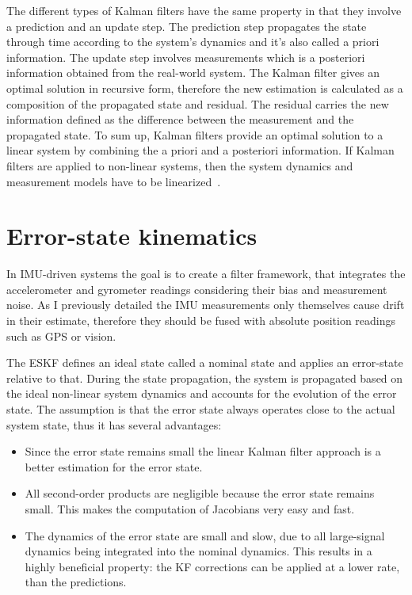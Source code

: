 The different types of Kalman filters have the same property in that they involve a prediction and an update step. The prediction step propagates the state through time according to the system's dynamics and it's also called a priori information. The update step involves measurements which is a posteriori information obtained from the real-world system. The Kalman filter gives an optimal solution in recursive form, therefore the new estimation is calculated as a composition of the propagated state and residual. The residual carries the new information defined as the difference between the measurement and the propagated state. To sum up, Kalman filters provide an optimal solution to a linear system by combining the a priori and a posteriori information. If Kalman filters are applied to non-linear systems, then the system dynamics and measurement models have to be linearized~\cite{discrete_kalman_tutorial}.


\section{Error-state kinematics}

In IMU-driven systems the goal is to create a filter framework, that integrates the accelerometer and gyrometer readings considering their bias and measurement noise. As I previously detailed the IMU measurements only themselves cause drift in their estimate, therefore they should be fused with absolute position readings such as GPS or vision.

The ESKF defines an ideal state called a nominal state and applies an error-state relative to that. During the state propagation, the system is propagated based on the ideal non-linear system dynamics and accounts for the evolution of the error state. The assumption is that the error state always operates close to the actual system state, thus it has several advantages:
\begin{itemize}
    \item 
     Since the error state remains small the linear Kalman filter approach is a better estimation for the error state.

    \item
    All second-order products are negligible because the error state remains small. This makes the computation of Jacobians very easy and fast. 

    \item 
    The dynamics of the error state are small and slow, due to all large-signal dynamics being integrated into the nominal dynamics. This results in a highly beneficial property: the KF corrections can be applied at a lower rate, than the predictions.
\end{itemize}

